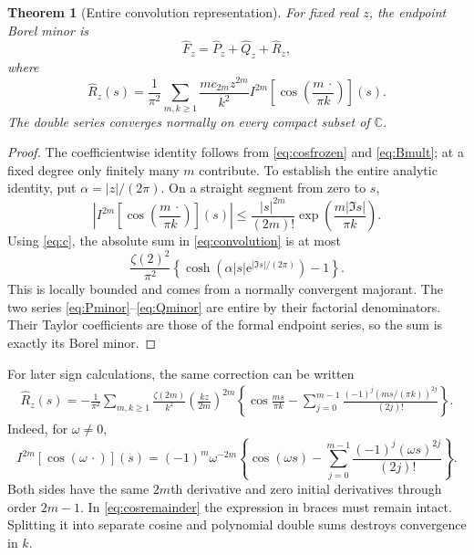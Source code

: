 \documentclass[11pt,a4paper]{article}
\numberwithin{equation}{section}
\newtheorem{theorem}{Theorem}[section]
\theoremstyle{definition}
\theoremstyle{remark}
\newcommand{\C}{\mathbb C}
\newcommand{\e}{\mathrm e}
\begin{document}
\begin{theorem}[Entire convolution representation]
\label{thm:entire}
For fixed real $z$, the endpoint Borel minor is
\begin{equation}
 \widehat F_z=\widehat P_z+\widehat Q_z+\widehat R_z,
 \label{eq:entiredecomp}
\end{equation}
where
\begin{equation}
 \widehat R_z(s)=\frac1{\pi^2}\sum_{m,k\ge1}
 \frac{m c_{2m}z^{2m}}{k^2}
 I^{2m}\!\left[\cos\left(\frac{m\,\cdot}{\pi k}\right)\right](s).
 \label{eq:convolution}
\end{equation}
The double series converges normally on every compact subset of $\C$.
\end{theorem}
\begin{proof}
The coefficientwise identity follows from \eqref{eq:cosfrozen} and \eqref{eq:Bmult}; at a fixed degree only finitely many $m$ contribute. To establish the entire analytic identity, put $\alpha=|z|/(2\pi)$. On a straight segment from zero to $s$,
\begin{equation}
 \left|I^{2m}\!\left[\cos\left(\frac{m\,\cdot}{\pi k}\right)\right](s)\right|
 \le\frac{|s|^{2m}}{(2m)!}
             \exp\!\left(\frac{m|\Im s|}{\pi k}\right).
 \label{eq:Ibound}
\end{equation}
Using \eqref{eq:c}, the absolute sum in \eqref{eq:convolution} is at most
\begin{equation}
 \frac{\zeta(2)^2}{\pi^2}
 \left\{\cosh\!\left(\alpha|s|\e^{|\Im s|/(2\pi)}\right)-1\right\}.
 \label{eq:globalBbound}
\end{equation}
This is locally bounded and comes from a normally convergent majorant. The two series \eqref{eq:Pminor}--\eqref{eq:Qminor} are entire by their factorial denominators. Their Taylor coefficients are those of the formal endpoint series, so the sum is exactly its Borel minor.
\end{proof}

For later sign calculations, the same correction can be written
\begin{align}
 \widehat R_z(s)=-\frac1{\pi^2}\sum_{m,k\ge1}
  \frac{\zeta(2m)}{k^2}\left(\frac{kz}{2m}\right)^{2m}
  \left\{\cos\frac{ms}{\pi k}
       -\sum_{j=0}^{m-1}\frac{(-1)^j(ms/(\pi k))^{2j}}{(2j)!}\right\}.
 \label{eq:cosremainder}
\end{align}
Indeed, for $\omega\ne0$,
\begin{equation}
 I^{2m}[\cos(\omega\,\cdot)](s)
 =(-1)^m\omega^{-2m}
       \left\{\cos(\omega s)-\sum_{j=0}^{m-1}
                 \frac{(-1)^j(\omega s)^{2j}}{(2j)!}\right\}.
 \label{eq:Icos}
\end{equation}
Both sides have the same $2m$th derivative and zero initial derivatives through order $2m-1$. In \eqref{eq:cosremainder} the expression in braces must remain intact. Splitting it into separate cosine and polynomial double sums destroys convergence in $k$.
\end{document}

